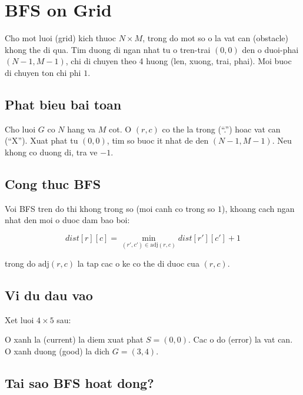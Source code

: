 \section{BFS on Grid}

Cho mot luoi (grid) kich thuoc $N \times M$, trong do mot so o la vat can (obstacle) khong the di qua. Tim duong di ngan nhat tu o tren-trai $(0, 0)$ den o duoi-phai $(N-1, M-1)$, chi di chuyen theo 4 huong (len, xuong, trai, phai). Moi buoc di chuyen ton chi phi $1$.

\subsection{Phat bieu bai toan}

Cho luoi $G$ co $N$ hang va $M$ cot. O $(r, c)$ co the la trong (``.'') hoac vat can (``X''). Xuat phat tu $(0, 0)$, tim so buoc it nhat de den $(N-1, M-1)$. Neu khong co duong di, tra ve $-1$.

\subsection{Cong thuc BFS}

Voi BFS tren do thi khong trong so (moi canh co trong so $1$), khoang cach ngan nhat den moi o duoc dam bao boi:

$$ dist[r][c] = \min_{(r',c') \in \text{adj}(r,c)} dist[r'][c'] + 1 $$

trong do $\text{adj}(r,c)$ la tap cac o ke co the di duoc cua $(r,c)$.

\subsection{Vi du dau vao}

Xet luoi $4 \times 5$ sau:

\begin{diagram}
\end{diagram}

O xanh la (current) la diem xuat phat $S = (0,0)$. Cac o do (error) la vat can. O xanh duong (good) la dich $G = (3,4)$.

\subsection{Tai sao BFS hoat dong?}

